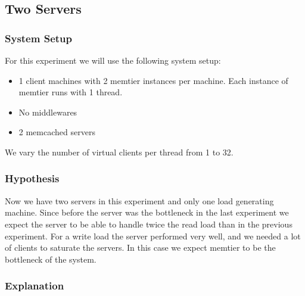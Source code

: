 \documentclass[11pt,a4paper]{article}
\begin{document}
\subsection{Two Servers}
%
\subsubsection{System Setup}
%
For this experiment we will use the following system setup:
%
\begin{itemize}
	\item 1 client machines with 2 memtier instances per machine. Each instance of memtier runs with 1 thread.
	\item No middlewares
	\item 2 memcached servers
\end{itemize}
%
We vary the number of virtual clients per thread from 1 to 32.
%
\subsubsection{Hypothesis}
%
Now we have two servers in this experiment and only one load generating machine.
%
Since before the server was the bottleneck in the last experiment we expect the server to be able to handle twice the read load than in the previous experiment.
%
For a write load the server performed very well, and we needed a lot of clients to saturate the servers.
%
In this case we expect memtier to be the bottleneck of the system.
%
\subsubsection{Explanation}
%
\end{document}
